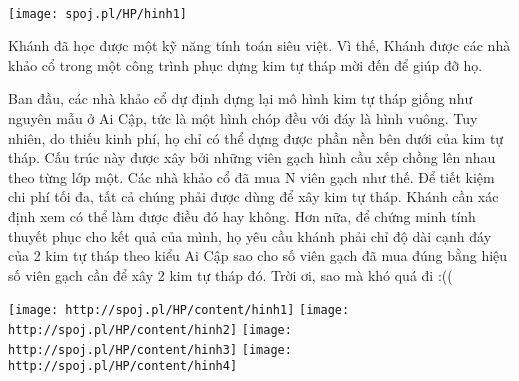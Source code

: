  


\texttt{[image: spoj.pl/HP/hinh1]}

Khánh đã học được một kỹ năng tính toán siêu việt. Vì thế, Khánh được các nhà khảo cổ trong một công trình phục dựng kim tự tháp mời đến để giúp đỡ họ.

Ban đầu, các nhà khảo cổ dự định dựng lại mô hình kim tự tháp giống như nguyên mẫu ở Ai Cập, tức là một hình chóp đều với đáy là hình vuông. Tuy nhiên, do thiếu kinh phí, họ chỉ có thể dựng được phần nền bên dưới của kim tự tháp. Cấu trúc này được xây bởi những viên gạch hình cầu xếp chồng lên nhau theo từng lớp một. Các nhà khảo cổ đã mua N viên gạch như thế. Để tiết kiệm chi phí tối đa, tất cả chúng phải được dùng để xây kim tự tháp. Khánh cần xác định xem có thể làm được điều đó hay không. Hơn nữa, để chứng minh tính thuyết phục cho kết quả của mình, họ yêu cầu khánh phải chỉ độ dài cạnh đáy của 2 kim tự tháp theo kiểu Ai Cập sao cho số viên gạch đã mua đúng bằng hiệu số viên gạch cần để xây 2 kim tự tháp đó. Trời ơi, sao mà khó quá đi :((


\texttt{[image: http://spoj.pl/HP/content/hinh1]}
\texttt{[image: http://spoj.pl/HP/content/hinh2]}
\texttt{[image: http://spoj.pl/HP/content/hinh3]}
\texttt{[image: http://spoj.pl/HP/content/hinh4]}

 

\